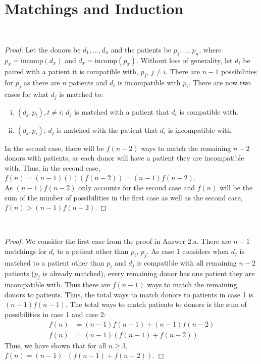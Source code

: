 \documentclass[11pt]{scrartcl}
\theoremstyle{dotlessP}
\theoremstyle{dotlessN}
\begin{document}
\section{Matchings and Induction}
\begin{ans}
\
	\begin{proof}
		Let the donors be $d_1, \dots, d_n$ and the patients be $p_1, \dots, p_n$, where $p_x = \text{incomp}(d_x)$ and $d_x = \text{incomp}(p_x)$. Without loss of generality, let $d_i$ be paired with a patient it is compatible with, $p_j$, $j \neq i$. There are $n-1$ possibilities for $p_j$ as there are $n$ patients and $d_i$ is incompatible with $p_i$. There are now two cases for what $d_j$ is matched to: 
\begin{enumerate}[i)]
	\item $(d_j, p_t), t \neq i$; $d_j$ is matched with a patient that $d_i$ is compatible with.
	\item $(d_j, p_i)$; $d_j$ is matched with the patient that  $d_i$ is incompatible with.
\end{enumerate}
In the second case, there will be $f(n-2)$ ways to match the remaining $n-2$ donors with patients, as each donor will have a patient they are incompatible with. Thus, in the second case,  $f(n) = (n-1)(1)(f(n-2)) = (n-1)f(n-2)$.
\\

As  $(n-1)f(n-2)$ only accounts for the second case and $f(n)$ will be the sum of the number of possibilities in the first case as well as the second case,  $f(n) > (n-1)f(n-2)$.
	\end{proof}
\end{ans}
\begin{ans}
\
	\begin{proof}
		We consider the first case from the proof in Answer 2.a. There are $n-1$ matchings for $d_i$ to a patient other than $p_i$, $p_j$. As case 1 considers when  $d_j$ is matched to a patient other than $p_i$ and  $d_j$ is compatible with all remaining $n-2$ patients ($p_j$ is already matched), every remaining donor has one patient they are incompatible with. Thus there are $f(n-1)$ ways to match the remaining donors to patients. Thus, the total ways to match donors to patients in case 1 is $(n-1)f(n-1)$. The total ways to match patients to donors is the sum of possibilities in case 1 and case 2:
		\begin{align*}
			f(n) &= (n-1)f(n-1) + (n-1)f(n-2) \\
			f(n) &= (n-1)(f(n-1) + f(n-2))
		\end{align*}
Thus, we have shown that for all $n \geq 3$, $f(n) = (n-1) \cdot (f(n-1) + f(n-2))$.
	\end{proof}
\end{ans}
\end{document}
